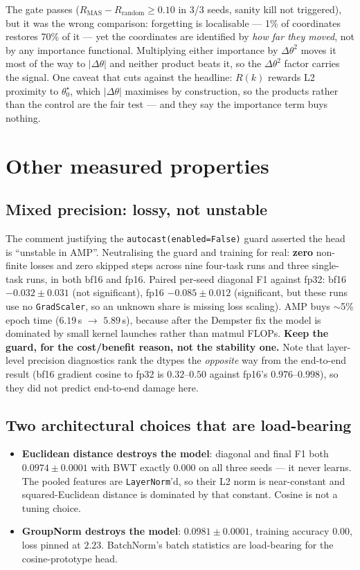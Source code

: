 \documentclass{article}
\begin{document}
The gate passes ($R_{\text{MAS}} - R_{\text{random}} \ge 0.10$ in 3/3 seeds,
sanity kill not triggered), but it was the wrong comparison: forgetting is
localisable --- 1\% of coordinates restores 70\% of it --- yet the coordinates
are identified by \emph{how far they moved}, not by any importance functional.
Multiplying either importance by $\Delta\theta^2$ moves it most of the way to
$|\Delta\theta|$ and neither product beats it, so the $\Delta\theta^2$ factor
carries the signal. One caveat that cuts against the headline: $R(k)$ rewards L2
proximity to $\theta_0^\star$, which $|\Delta\theta|$ maximises by construction,
so the products rather than the control are the fair test --- and they say the
importance term buys nothing.

\section{Other measured properties}

\subsection{Mixed precision: lossy, not unstable}
\label{sec:amp}

The comment justifying the \texttt{autocast(enabled=False)} guard asserted the
head is ``unstable in AMP''. Neutralising the guard and training for real:
\textbf{zero} non-finite losses and zero skipped steps across nine four-task runs
and three single-task runs, in both bf16 and fp16. Paired per-seed diagonal F1
against fp32: bf16 $-0.032 \pm 0.031$ (not significant), fp16
$-0.085 \pm 0.012$ (significant, but these runs use no \texttt{GradScaler}, so an
unknown share is missing loss scaling). AMP buys $\sim$5\% epoch time
($6.19$\,s $\to$ $5.89$\,s), because after the Dempster fix the model is dominated
by small kernel launches rather than matmul FLOPs. \textbf{Keep the guard, for the
cost/benefit reason, not the stability one.} Note that layer-level precision
diagnostics rank the dtypes the \emph{opposite} way from the end-to-end result
(bf16 gradient cosine to fp32 is $0.32$--$0.50$ against fp16's $0.976$--$0.998$),
so they did not predict end-to-end damage here.

\subsection{Two architectural choices that are load-bearing}

\begin{itemize}
  \item \textbf{Euclidean distance destroys the model}: diagonal and final F1
        both $0.0974 \pm 0.0001$ with BWT exactly $0.000$ on all three seeds --- it
        never learns. The pooled features are \texttt{LayerNorm}'d, so their L2
        norm is near-constant and squared-Euclidean distance is dominated by that
        constant. Cosine is not a tuning choice.
  \item \textbf{GroupNorm destroys the model}: $0.0981 \pm 0.0001$, training
        accuracy $0.00$, loss pinned at $2.23$. BatchNorm's batch statistics are
        load-bearing for the cosine-prototype head.
\end{itemize}
\end{document}
